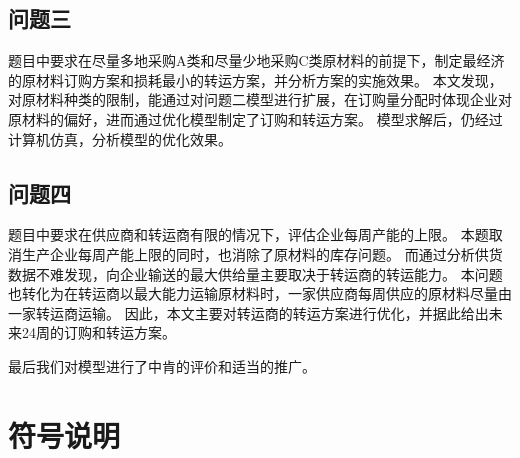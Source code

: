 \subsection{问题三}
题目中要求在尽量多地采购A类和尽量少地采购C类原材料的前提下，制定最经济的原材料订购方案和损耗最小的转运方案，并分析方案的实施效果。
本文发现，对原材料种类的限制，能通过对问题二模型进行扩展，在订购量分配时体现企业对原材料的偏好，进而通过优化模型制定了订购和转运方案。
模型求解后，仍经过计算机仿真，分析模型的优化效果。

\subsection{问题四}
题目中要求在供应商和转运商有限的情况下，评估企业每周产能的上限。
本题取消生产企业每周产能上限的同时，也消除了原材料的库存问题。
而通过分析供货数据不难发现，向企业输送的最大供给量主要取决于转运商的转运能力。
本问题也转化为在转运商以最大能力运输原材料时，一家供应商每周供应的原材料尽量由一家转运商运输。
因此，本文主要对转运商的转运方案进行优化，并据此给出未来24周的订购和转运方案。

最后我们对模型进行了中肯的评价和适当的推广。

\section{符号说明} %
\label{sec:符号说明}

\begin{table}[!htbp]
\centering
\caption[文中符号所用说明]{文中符号所用说明}
\end{table}

